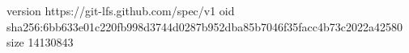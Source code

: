 version https://git-lfs.github.com/spec/v1
oid sha256:6bb633e01c220fb998d3744d0287b952dba85b7046f35facc4b73c2022a42580
size 14130843
